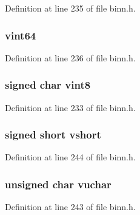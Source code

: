 Definition at line 235 of file binn.\+h.

\subsubsection[{\texorpdfstring{vint64}{vint64}}]{ vint64}\hypertarget{structbinn__struct_a5cc6015a1a362b566b460ed13e5da462}{}\label{structbinn__struct_a5cc6015a1a362b566b460ed13e5da462}


Definition at line 236 of file binn.\+h.

\subsubsection[{\texorpdfstring{vint8}{vint8}}]{\setlength{\rightskip}{0pt plus 5cm}signed char vint8}\hypertarget{structbinn__struct_acaf2c9081db8297354d234495a73ef16}{}\label{structbinn__struct_acaf2c9081db8297354d234495a73ef16}


Definition at line 233 of file binn.\+h.

\subsubsection[{\texorpdfstring{vshort}{vshort}}]{\setlength{\rightskip}{0pt plus 5cm}signed short vshort}\hypertarget{structbinn__struct_af9bacb6feb36a3bd39e30d569200974a}{}\label{structbinn__struct_af9bacb6feb36a3bd39e30d569200974a}


Definition at line 244 of file binn.\+h.

\subsubsection[{\texorpdfstring{vuchar}{vuchar}}]{\setlength{\rightskip}{0pt plus 5cm}unsigned char vuchar}\hypertarget{structbinn__struct_addab104cb8914a50f76a78d856f9f87e}{}\label{structbinn__struct_addab104cb8914a50f76a78d856f9f87e}


Definition at line 243 of file binn.\+h.

